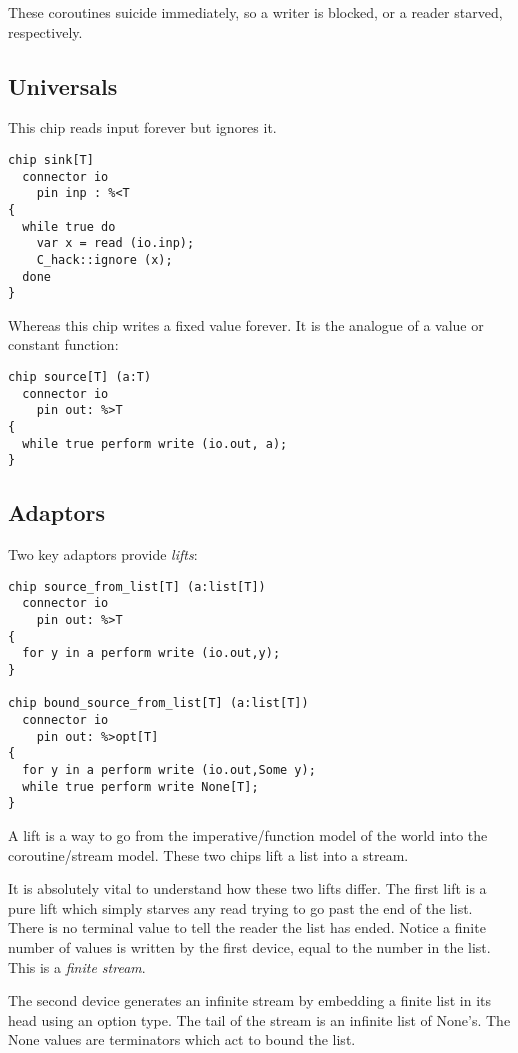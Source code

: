 \documentclass[oneside]{book}
\begin{document}
These coroutines suicide immediately, so a writer is blocked,
or a reader starved, respectively.

\subsection{Universals}
This chip reads input forever but ignores it.

\begin{verbatim}
chip sink[T]
  connector io
    pin inp : %<T
{
  while true do
    var x = read (io.inp);
    C_hack::ignore (x);
  done
}
\end{verbatim}

Whereas this chip writes a fixed value forever.
It is the analogue of a value or constant function:

\begin{verbatim}
chip source[T] (a:T)
  connector io
    pin out: %>T
{
  while true perform write (io.out, a);
}
\end{verbatim}

\subsection{Adaptors}
Two key adaptors provide {\em lifts}:


\begin{verbatim}
chip source_from_list[T] (a:list[T])
  connector io
    pin out: %>T
{
  for y in a perform write (io.out,y);
}

chip bound_source_from_list[T] (a:list[T])
  connector io
    pin out: %>opt[T]
{
  for y in a perform write (io.out,Some y);
  while true perform write None[T];
}
\end{verbatim}

A lift is a way to go from the imperative/function model
of the world into the coroutine/stream model. These
two chips lift a list into a stream.

It is absolutely vital to understand how these two
lifts differ. The first lift is a pure lift
which simply starves any read trying to go past the
end of the list. There is no terminal value to tell the
reader the list has ended. Notice a finite number
of values is written by the first device, equal to the
number in the list. This is a {\em finite stream}.

The second device generates an infinite stream
by embedding a finite list in its head using 
an option type. The tail of the stream is an infinite
list of None's. The None values are terminators which
act to bound the list.
\end{document}
